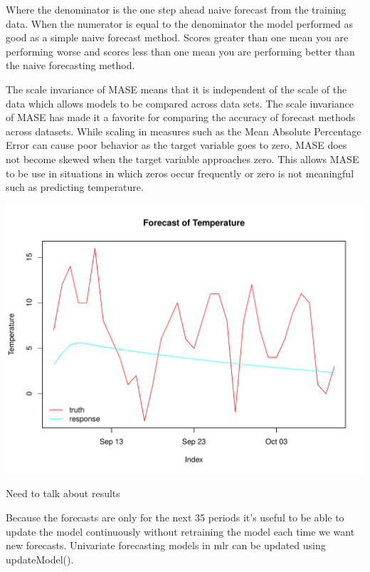 \documentclass[12pt]{article}\usepackage[]{graphicx}\usepackage[]{color}
\makeatletter
\def\maxwidth{ %
  \ifdim\Gin@nat@width>\linewidth
    \linewidth
  \else
    \Gin@nat@width
  \fi
}
\newenvironment{knitrout}{}{} %
\theoremstyle{definition}
\newcommand\code{\@codex}
\def\@codex#1{{\normalfont\ttfamily\hyphenchar\font=-1 #1}}
\newcommand{\pkg}[1]{{\fontseries{b}\selectfont #1}}
\makeatother
\begin{document}
Where the denominator is the one step ahead naive forecast from the training data. When the numerator is equal to the denominator the model performed as good as a simple naive forecast method. Scores greater than one mean you are performing worse and scores less than one mean you are performing better than the naive forecasting method.

The scale invariance of MASE means that it is independent of the scale of the data which allows models to be compared across data sets. The scale invariance of MASE has made it a favorite for comparing the accuracy of forecast methods ~\cite{noteMase} across datasets. While scaling in measures such as the Mean Absolute Percentage Error can cause poor behavior as the target variable goes to zero, MASE does not become skewed when the target variable approaches zero. This allows MASE to be use in situations in which zeros occur frequently or zero is not meaningful such as predicting temperature. 

\singlespacing
\begin{knitrout}
\color{fgcolor}

{\centering \includegraphics[width=\maxwidth]{figure/plotbatsTrain-1} 

}



\end{knitrout}
\doublespacing

Need to talk about results

Because the forecasts are only for the next 35 periods it's useful to be able to update the model continuously without retraining the model each time we want new forecasts. Univariate forecasting models in \pkg{mlr} can be updated using \code{updateModel()}. 
\end{document}
